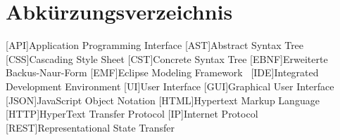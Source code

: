 \chapter*{Abkürzungsverzeichnis}


\begin{acronym}
    [API]{Application Programming Interface}
    [AST]{Abstract Syntax Tree}
    [CSS]{Cascading Style Sheet}
    [CST]{Concrete Syntax Tree}
    [EBNF]{Erweiterte Backus-Naur-Form}
    [EMF]{Eclipse Modeling Framework~\cite{emf}}
    [IDE]{Integrated Development Environment}
    [UI]{User Interface}
    [GUI]{Graphical User Interface}
    [JSON]{JavaScript Object Notation}
    [HTML]{Hypertext Markup Language}
    [HTTP]{HyperText Transfer Protocol}
    [IP]{Internet Protocol}
    [REST]{Representational State Transfer}
\end{acronym}

